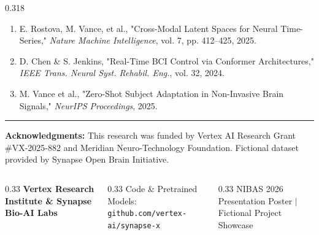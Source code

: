 \documentclass[final]{beamer}
\begin{document}
\begin{frame}[t]
\begin{columns}[t]
\begin{column}{0.318\textwidth}
    \vspace{10pt}

    \begin{tcolorbox}[posterbox, title={\faBook{} References \& Acknowledgments}]
      \tiny
      \begin{enumerate}
        \item E. Rostova, M. Vance, et al., "Cross-Modal Latent Spaces for Neural Time-Series," \textit{Nature Machine Intelligence}, vol. 7, pp. 412--425, 2025.
        \item D. Chen \& S. Jenkins, "Real-Time BCI Control via Conformer Architectures," \textit{IEEE Trans. Neural Syst. Rehabil. Eng.}, vol. 32, 2024.
        \item M. Vance et al., "Zero-Shot Subject Adaptation in Non-Invasive Brain Signals," \textit{NeurIPS Proceedings}, 2025.
      \end{enumerate}
      
      \vspace{4pt}
      \hrule
      \vspace{4pt}
      \textbf{Acknowledgments:} This research was funded by Vertex AI Research Grant \#VX-2025-882 and Meridian Neuro-Technology Foundation. Fictional dataset provided by Synapse Open Brain Initiative.
    \end{tcolorbox}

  \end{column}

\end{columns}

\vspace{12pt}

\begin{tcolorbox}[
  enhanced,
  colback=secondary,
  colframe=secondary,
  arc=0pt,
  boxrule=0pt,
  left=20pt, right=20pt, top=10pt, bottom=10pt
]
\begin{columns}[c]
  \begin{column}{0.33\textwidth}
    {\color{white}\small \faBuilding{} \textbf{Vertex Research Institute \& Synapse Bio-AI Labs}}
  \end{column}
  \begin{column}{0.33\textwidth}
    \centering
    {\color{highlight}\small \faCode{} Code \& Pretrained Models: \texttt{github.com/vertex-ai/synapse-x}}
  \end{column}
  \begin{column}{0.33\textwidth}
    \raggedleft
    {\color{white}\small NIBAS 2026 Presentation Poster \quad $\mid$ \quad Fictional Project Showcase}
  \end{column}
\end{columns}
\end{tcolorbox}

\end{frame}
\end{document}
